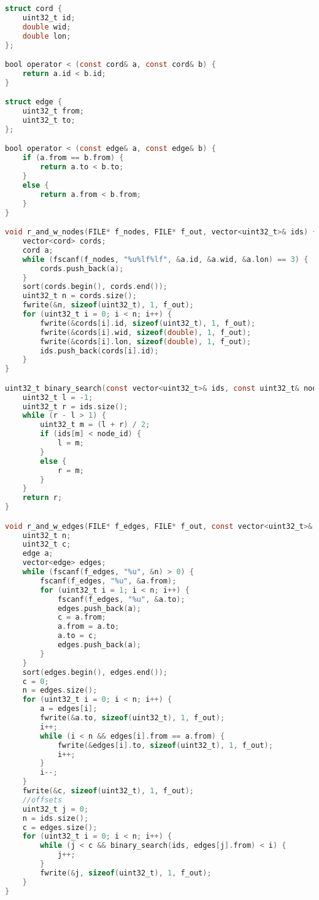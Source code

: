 \begin{lstlisting}[language=C]
struct cord {
    uint32_t id;
    double wid;
    double lon;
};

bool operator < (const cord& a, const cord& b) {
    return a.id < b.id;
}

struct edge {
    uint32_t from;
    uint32_t to;
};

bool operator < (const edge& a, const edge& b) {
    if (a.from == b.from) {
        return a.to < b.to;
    }
    else {
        return a.from < b.from;
    }
}

void r_and_w_nodes(FILE* f_nodes, FILE* f_out, vector<uint32_t>& ids) {
    vector<cord> cords;
    cord a;
    while (fscanf(f_nodes, "%u%lf%lf", &a.id, &a.wid, &a.lon) == 3) {
        cords.push_back(a);
    }
    sort(cords.begin(), cords.end());
    uint32_t n = cords.size();
    fwrite(&n, sizeof(uint32_t), 1, f_out);
    for (uint32_t i = 0; i < n; i++) {
        fwrite(&cords[i].id, sizeof(uint32_t), 1, f_out);
        fwrite(&cords[i].wid, sizeof(double), 1, f_out);
        fwrite(&cords[i].lon, sizeof(double), 1, f_out);
        ids.push_back(cords[i].id);
    }
}

uint32_t binary_search(const vector<uint32_t>& ids, const uint32_t& node_id) {
    uint32_t l = -1;
    uint32_t r = ids.size();
    while (r - l > 1) {
        uint32_t m = (l + r) / 2;
        if (ids[m] < node_id) {
            l = m;
        }
        else {
            r = m;
        }
    }
    return r;
}

void r_and_w_edges(FILE* f_edges, FILE* f_out, const vector<uint32_t>& ids) {
    uint32_t n;
    uint32_t c;
    edge a;
    vector<edge> edges;
    while (fscanf(f_edges, "%u", &n) > 0) {
        fscanf(f_edges, "%u", &a.from);
        for (uint32_t i = 1; i < n; i++) {
            fscanf(f_edges, "%u", &a.to);
            edges.push_back(a);
            c = a.from;
            a.from = a.to;
            a.to = c;
            edges.push_back(a);
        }
    }
    sort(edges.begin(), edges.end());
    c = 0;
    n = edges.size();
    for (uint32_t i = 0; i < n; i++) {
        a = edges[i];
        fwrite(&a.to, sizeof(uint32_t), 1, f_out);
        i++;
        while (i < n && edges[i].from == a.from) {
            fwrite(&edges[i].to, sizeof(uint32_t), 1, f_out);
            i++;
        }
        i--;
    }
    fwrite(&c, sizeof(uint32_t), 1, f_out);
    //offsets
    uint32_t j = 0;
    n = ids.size();
    c = edges.size();
    for (uint32_t i = 0; i < n; i++) {
        while (j < c && binary_search(ids, edges[j].from) < i) {
            j++;
        }
        fwrite(&j, sizeof(uint32_t), 1, f_out);
    }
}


\end{lstlisting}
